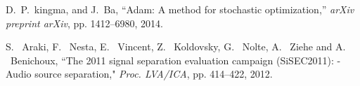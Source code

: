 \documentclass[honka]{nitkagawathesis}%
\begin{document}
\begin{thebibliography}{99}
  D.~P.~kingma, and J.~Ba, ``Adam: A method for stochastic optimization,''
  {\em arXiv preprint arXiv}, pp. 1412--6980, 2014.
  
  S. ~Araki, F. ~Nesta, E. ~Vincent, Z. ~Koldovsky, G. ~Nolte, A. ~Ziehe and A. ~Benichoux, ``The 2011 signal separation evaluation campaign (SiSEC2011): -Audio source separation," {\em Proc. LVA/ICA}, pp. 414--422, 2012.
  
  
\end{thebibliography}


% 



\appendix


\end{document}
